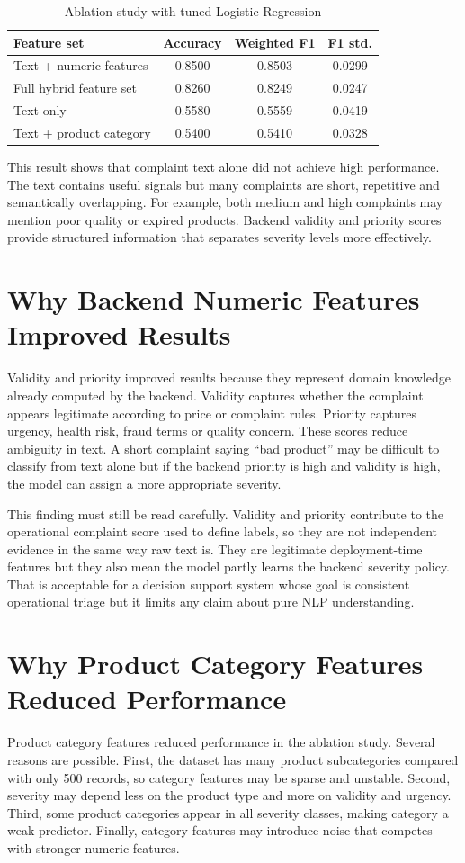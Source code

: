 \documentclass[12pt,a4paper,openany]{book}
\begin{document}
\begin{table}[H]
\centering
\caption{Ablation study with tuned Logistic Regression}
\label{tab:ablation}
\begin{tabular}{lccc}
\toprule
\textbf{Feature set} & \textbf{Accuracy} & \textbf{Weighted F1} & \textbf{F1 std.}\\
\midrule
Text + numeric features & 0.8500 & 0.8503 & 0.0299\\
Full hybrid feature set & 0.8260 & 0.8249 & 0.0247\\
Text only & 0.5580 & 0.5559 & 0.0419\\
Text + product category & 0.5400 & 0.5410 & 0.0328\\
\bottomrule
\end{tabular}
\end{table}

This result shows that complaint text alone did not achieve high performance. The text contains useful signals but many complaints are short, repetitive and semantically overlapping. For example, both medium and high complaints may mention poor quality or expired products. Backend validity and priority scores provide structured information that separates severity levels more effectively.

\section{Why Backend Numeric Features Improved Results}
Validity and priority improved results because they represent domain knowledge already computed by the backend. Validity captures whether the complaint appears legitimate according to price or complaint rules. Priority captures urgency, health risk, fraud terms or quality concern. These scores reduce ambiguity in text. A short complaint saying ``bad product'' may be difficult to classify from text alone but if the backend priority is high and validity is high, the model can assign a more appropriate severity.

This finding must still be read carefully. Validity and priority contribute to the operational complaint score used to define labels, so they are not independent evidence in the same way raw text is. They are legitimate deployment-time features but they also mean the model partly learns the backend severity policy. That is acceptable for a decision support system whose goal is consistent operational triage but it limits any claim about pure NLP understanding.

\section{Why Product Category Features Reduced Performance}
Product category features reduced performance in the ablation study. Several reasons are possible. First, the dataset has many product subcategories compared with only 500 records, so category features may be sparse and unstable. Second, severity may depend less on the product type and more on validity and urgency. Third, some product categories appear in all severity classes, making category a weak predictor. Finally, category features may introduce noise that competes with stronger numeric features.
\end{document}
